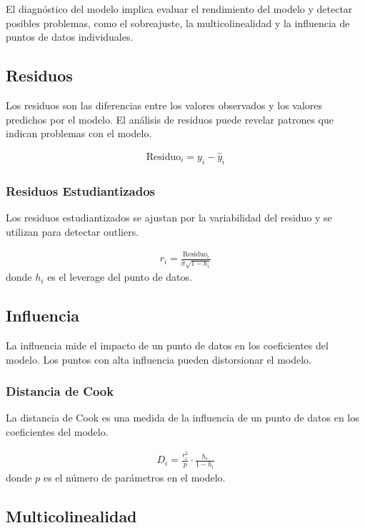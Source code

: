 \documentclass[a4paper]{report} %
\begin{document}
El diagn\'ostico del modelo implica evaluar el rendimiento del modelo y detectar posibles problemas, como el sobreajuste, la multicolinealidad y la influencia de puntos de datos individuales.

\subsection{Residuos}

Los residuos son las diferencias entre los valores observados y los valores predichos por el modelo. El an\'alisis de residuos puede revelar patrones que indican problemas con el modelo.

\begin{eqnarray*}
\text{Residuo}_i = y_i - \hat{y}_i
\end{eqnarray*}

\subsubsection{Residuos Estudiantizados}

Los residuos estudiantizados se ajustan por la variabilidad del residuo y se utilizan para detectar outliers.

\begin{eqnarray*}
r_i = \frac{\text{Residuo}_i}{\hat{\sigma} \sqrt{1 - h_i}}
\end{eqnarray*}
donde $h_i$ es el leverage del punto de datos.

\subsection{Influencia}

La influencia mide el impacto de un punto de datos en los coeficientes del modelo. Los puntos con alta influencia pueden distorsionar el modelo.

\subsubsection{Distancia de Cook}

La distancia de Cook es una medida de la influencia de un punto de datos en los coeficientes del modelo.

\begin{eqnarray*}
D_i = \frac{r_i^2}{p} \cdot \frac{h_i}{1 - h_i}
\end{eqnarray*}
donde $p$ es el n\'umero de par\'ametros en el modelo.

\subsection{Multicolinealidad}
\end{document}
